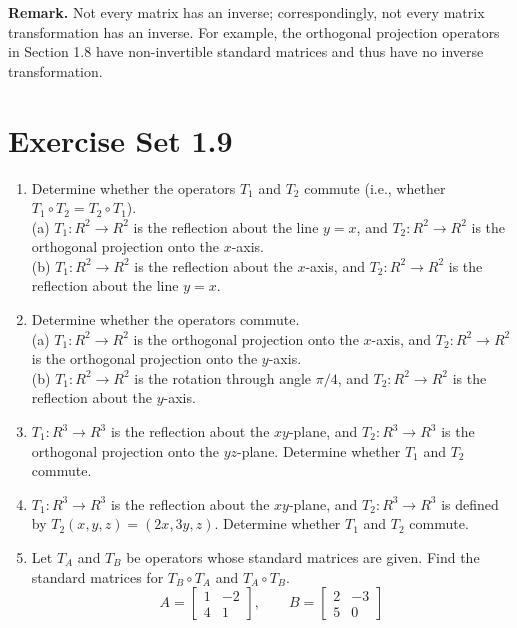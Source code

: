 \documentclass{article}
\theoremstyle{mystyle}
\begin{document}
\noindent\textbf{Remark.} Not every matrix has an inverse; correspondingly, not every matrix transformation has an inverse. For example, the orthogonal projection operators in Section 1.8 have non-invertible standard matrices and thus have no inverse transformation.

\section*{Exercise Set 1.9}

\begin{enumerate}
\item[1.] Determine whether the operators $T_1$ and $T_2$ commute (i.e., whether $T_1\circ T_2=T_2\circ T_1$).\\
(a) $T_1:R^2\to R^2$ is the reflection about the line $y=x$, and $T_2:R^2\to R^2$ is the orthogonal projection onto the $x$-axis.\\
(b) $T_1:R^2\to R^2$ is the reflection about the $x$-axis, and $T_2:R^2\to R^2$ is the reflection about the line $y=x$.

\item[2.] Determine whether the operators commute.\\
(a) $T_1:R^2\to R^2$ is the orthogonal projection onto the $x$-axis, and $T_2:R^2\to R^2$ is the orthogonal projection onto the $y$-axis.\\
(b) $T_1:R^2\to R^2$ is the rotation through angle $\pi/4$, and $T_2:R^2\to R^2$ is the reflection about the $y$-axis.

\item[3.] $T_1:R^3\to R^3$ is the reflection about the $xy$-plane, and $T_2:R^3\to R^3$ is the orthogonal projection onto the $yz$-plane. Determine whether $T_1$ and $T_2$ commute.

\item[4.] $T_1:R^3\to R^3$ is the reflection about the $xy$-plane, and $T_2:R^3\to R^3$ is defined by $T_2(x,y,z)=(2x,3y,z)$. Determine whether $T_1$ and $T_2$ commute.

\item[5.] Let $T_A$ and $T_B$ be operators whose standard matrices are given. Find the standard matrices for $T_B\circ T_A$ and $T_A\circ T_B$.
\[
A=\begin{bmatrix}1&-2\\4&1\end{bmatrix},\qquad B=\begin{bmatrix}2&-3\\5&0\end{bmatrix}
\]


\end{enumerate}
\end{document}
